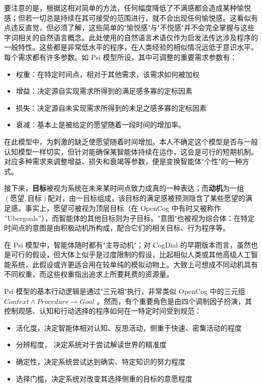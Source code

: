 要注意的是，根据这相对简单的方法，任何幅度降低了不满感都会造成某种愉悦感；但若一切总是持续在其可接受的范围进行，就不会出现任何愉悦感。这看似有点违反直觉，但必须了解，这些简单的"愉悦感"与"不悦感"并不会完全掌握与这些字词相关的自然语言概念。此处使用的自然语言术语仅作为启发法传达涉及程序的一般特性。这些都是非常低水平的程序，在人类经验的相似情况远低于意识水平。
每个需求都有许多参数。如 Psi 模型所设，其中可调整的重要需求参数有：

\begin{itemize}
\item 权重：在特定时间点，相对于其他需求，该需求如何被加权
\item  增益：决定源自实现需求所得到的满足感多寡的定标因素
\item  损失：决定源自未实现需求所得到的未足之感多寡的定标因素
\item  衰减：基本上是被给定的愿望随着一段时间的增加率。

\end{itemize}

在此模型中，为刺激的缺乏使愿望随着时间增加。本人不确定这个模型是否与一般认知模型一样切实，但针对能确保某智能体持续在运作，这会是可行的短期机制。对应多种需求来调整增益、损失和衰竭等参数，便是变换智能体"个性"的一种方式。

接下来，{\bf 目标}被视为系统在未来某时间点致力成真的一种表达；而{\bf 动机}为一组 $(愿望, 目标)$配对，由一目标组成，该目标的满足感被预测隐含了某些愿望的满足感。事实上，愿望可被视为顶层目标（在 OpenCog 中有时又被称作 ”Ubergoals”），而智能体的其他目标则为子目标。"意图"也被视为综合体：在特定时间点的意图是由积极动机所构成，配合它们的相关目标、行为程序等。

在 Psi 模型中，智能体随时都有"主导动机"；对 CogDial 的早期版本而言，虽然也是可行的假设，但大体上似乎是过度限制的假设，比起相似人类或其他高级人工智能系统，此假设或许更适合用在较单纯的模拟动物上。大致上可想成不同动机具有不同权重，而这些权重指出追求上所要耗费的资源量。

Psi 模型的基本行动逻辑是通过"三元祖"执行，非常类似 OpenCog 中的三元组$\textit{Context} \land \textit{Procedure} \rightarrow \textit{Goal}$ 。然而，有个重要角色是由四个调制因子扮演，其控制观感、认知和行动选择的程序如何在一特定时间受到规范：

\begin{itemize}
\item  活化度，决定智能体相对认知、反思活动，侧重于快速、密集活动的程度 
\item 分辨程度， 决定系统对于尝试解读世界的精准度 
\item 确定性，决定系统尝试达到确实、特定知识的努力程度 
\item 选择门槛，决定系统对改变其选择侧重的目标的意愿程度
\end{itemize}

